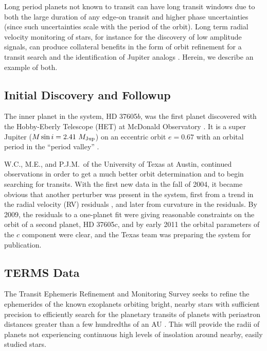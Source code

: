 Long period planets not known to transit can have long transit windows
due to both the large duration of any edge-on transit and higher phase
uncertainties (since such uncertainties scale with the period of the
orbit). Long term radial velocity monitoring of stars, for instance
for the discovery of low amplitude signals, can produce collateral
benefits in the form of orbit refinement for a transit search and the
identification of Jupiter analogs
\citep[e.g.,][]{2009ApJ...693.1084W}. Herein, we describe an example
of both.

\subsection{Initial Discovery and Followup}

The inner planet in the system, HD 37605$b$, was the first planet
discovered with the Hobby-Eberly Telescope (HET) at McDonald
Observatory \citep{cochran2004}.  It is a super Jupiter ($M\sin{i} =
2.41\ M_{\rm Jup}$) on an eccentric orbit $e=0.67$ with an orbital period in
the ``period valley'' \citep[$P=55$ days;][]{2009ApJ...693.1084W}.

W.C., M.E., and P.J.M.\, of the University of Texas at
Austin, continued observations in order to get a much better orbit determination
and to begin searching for transits. With the first new data in the
fall of 2004, it became obvious that another perturber was present in
the system, first from a trend in the radial velocity (RV) residuals
\citep[i.e., a none-zero $\mbox{d} v/\mbox{d} t$; ][]{wit2007}, and
later from curvature in the residuals. By 2009, the residuals to a
one-planet fit were giving reasonable constraints on the orbit of a
second planet, HD 37605$c$, and by early 2011 the orbital parameters
of the $c$ component were clear, and the Texas team was preparing the
system for publication.

\subsection{TERMS Data}

The Transit Ephemeris Refinement and Monitoring Survey \citep[TERMS;][]{Kane2009} seeks
to refine the ephemerides of the known exoplanets orbiting bright,
nearby stars with sufficient precision to efficiently search for the
planetary transits of planets with periastron distances greater than a
few hundredths of an AU
\citep{2011EPJWC..1106005K, 2011ApJ...743..162P, 2011AJ....142..115D}.
This will provide the radii of planets not experiencing continuous high
levels of insolation around nearby, easily studied stars.

